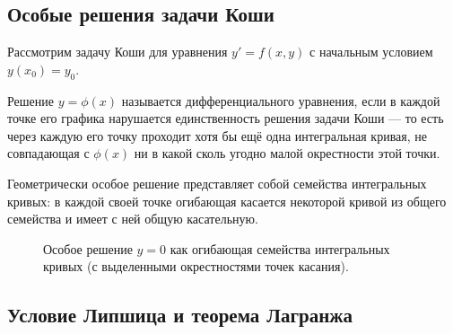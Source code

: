 \subsection{Особые решения задачи Коши}

Рассмотрим задачу Коши для уравнения $y' = f(x, y)$ с начальным условием
$y(x_0) = y_0$.

\begin{definition}
    Решение $y = \phi(x)$ называется 
    дифференциального уравнения, если в каждой точке его графика нарушается
    единственность решения задачи Коши — то есть через каждую его точку
    проходит хотя бы ещё одна интегральная кривая, не совпадающая с $\phi(x)$
    ни в какой сколь угодно малой окрестности этой точки.
\end{definition}

Геометрически особое решение представляет собой  семейства
интегральных кривых: в каждой своей точке огибающая касается некоторой кривой
из общего семейства и имеет с ней общую касательную.

\begin{figure}[H]
    \centering
    \caption{Особое решение $y = 0$ как огибающая семейства интегральных
    кривых (с выделенными окрестностями точек касания).}
\end{figure}

\subsection{Условие Липшица и теорема Лагранжа}

